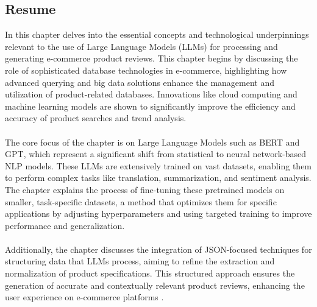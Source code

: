 \subsection{Resume}
In this chapter delves into the essential concepts and technological underpinnings relevant to the use of Large Language Models (LLMs) for processing and generating e-commerce product reviews. This chapter begins by discussing the role of sophisticated database technologies in e-commerce, highlighting how advanced querying and big data solutions enhance the management and utilization of product-related databases. Innovations like cloud computing and machine learning models are shown to significantly improve the efficiency and accuracy of product searches and trend analysis.
\\\\
The core focus of the chapter is on Large Language Models such as BERT and GPT, which represent a significant shift from statistical to neural network-based NLP models. These LLMs are extensively trained on vast datasets, enabling them to perform complex tasks like translation, summarization, and sentiment analysis. The chapter explains the process of fine-tuning these pretrained models on smaller, task-specific datasets, a method that optimizes them for specific applications by adjusting hyperparameters and using targeted training to improve performance and generalization.
\\\\
Additionally, the chapter discusses the integration of JSON-focused techniques for structuring data that LLMs process, aiming to refine the extraction and normalization of product specifications. This structured approach ensures the generation of accurate and contextually relevant product reviews, enhancing the user experience on e-commerce platforms .